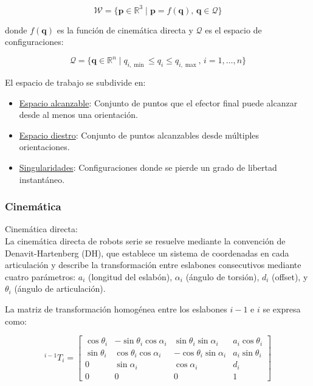 \begin{equation}
\mathcal{W} = \{\mathbf{p} \in \mathbb{R}^3 \mid \mathbf{p} = f(\mathbf{q}), \, \mathbf{q} \in \mathcal{Q}\}
\end{equation}

donde $f(\mathbf{q})$ es la función de cinemática directa y $\mathcal{Q}$ es el espacio de configuraciones:

\begin{equation}
\mathcal{Q} = \{\mathbf{q} \in \mathbb{R}^n \mid q_{i,\min} \leq q_i \leq q_{i,\max}, \, i = 1, \ldots, n\}
\end{equation}

El espacio de trabajo se subdivide en:

\begin{itemize}[label=$\bullet$]
    \item \underline{Espacio alcanzable}: Conjunto de puntos que el efector final puede alcanzar desde al menos una orientación.
    \item \underline{Espacio diestro}: Conjunto de puntos alcanzables desde múltiples orientaciones.
    \item \underline{Singularidades}: Configuraciones donde se pierde un grado de libertad instantáneo.
\end{itemize}

\subsubsection{Cinemática}

Cinemática directa:\\
\noindent
La cinemática directa de robots serie se resuelve mediante la convención de Denavit-Hartenberg (DH), que establece un sistema de coordenadas en cada articulación y describe la transformación entre eslabones consecutivos mediante cuatro parámetros: $a_i$ (longitud del eslabón), $\alpha_i$ (ángulo de torsión), $d_i$ (offset), y $\theta_i$ (ángulo de articulación).

La matriz de transformación homogénea entre los eslabones $i-1$ e $i$ se expresa como:

\begin{equation}
{}^{i-1}T_i = 
\begin{bmatrix}
\cos\theta_i & -\sin\theta_i\cos\alpha_i & \sin\theta_i\sin\alpha_i & a_i\cos\theta_i \\
\sin\theta_i & \cos\theta_i\cos\alpha_i & -\cos\theta_i\sin\alpha_i & a_i\sin\theta_i \\
0 & \sin\alpha_i & \cos\alpha_i & d_i \\
0 & 0 & 0 & 1
\end{bmatrix}
\end{equation}

